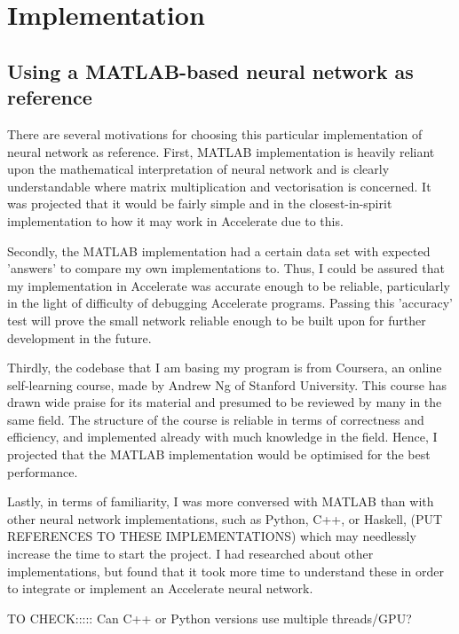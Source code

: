 
\chapter{Implementation}\label{ch:impl}

\section{Using a MATLAB-based neural network as reference} \label{se:impl.matlab.nn}

There are several motivations for choosing this particular implementation of neural network as reference. First, MATLAB implementation is heavily reliant upon the mathematical interpretation of neural network and is clearly understandable where matrix multiplication and vectorisation is concerned. It was projected that it would be fairly simple and in the closest-in-spirit implementation to how it may work in Accelerate due to this.

Secondly, the MATLAB implementation had a certain data set with expected 'answers' to compare my own implementations to. Thus, I could be assured that my implementation in Accelerate was accurate enough to be reliable, particularly in the light of difficulty of debugging Accelerate programs. Passing this 'accuracy' test will prove the small network reliable enough to be built upon for further development in the future.

Thirdly, the codebase that I am basing my program is from Coursera, an online self-learning course, made by Andrew Ng of Stanford University. This course has drawn wide praise for its material and presumed to be reviewed by many in the same field. The structure of the course is reliable in terms of correctness and efficiency, and implemented already with much knowledge in the field. Hence, I projected that the MATLAB implementation would be optimised for the best performance.

Lastly, in terms of familiarity, I was more conversed with MATLAB than with other neural network implementations, such as Python, C++, or Haskell, (PUT REFERENCES TO THESE IMPLEMENTATIONS) which may needlessly increase the time to start the project. I had researched about other implementations, but found that it took more time to understand these in order to integrate or implement an Accelerate neural network.

TO CHECK::::: Can C++ or Python versions use multiple threads/GPU?

